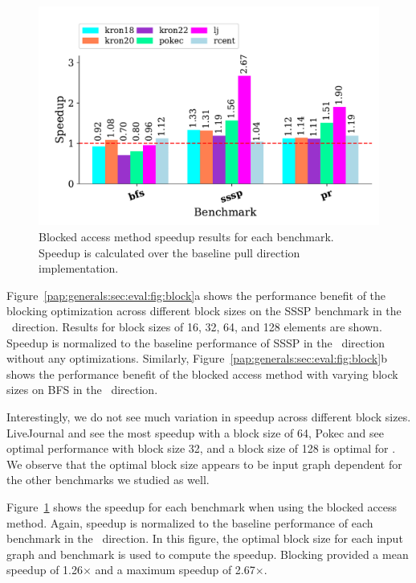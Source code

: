 \begin{figure}[h!]
    \centering
    \includegraphics[scale = 0.6]{graphit-figures/all-blocked.pdf}
    \caption{Blocked access method speedup results for each benchmark. Speedup is calculated over the baseline pull direction implementation.} %
    \label{pap:generals:sec:eval:fig:blocked}
\end{figure}
 
Figure~\ref{pap:generals:sec:eval:fig:block}a shows the performance benefit of the blocking optimization across different block sizes on the SSSP benchmark in the \pull~direction. 
Results for block sizes of 16, 32, 64, and 128 elements are shown.
Speedup is normalized to the baseline performance of SSSP in the \pull~direction without any optimizations.
Similarly, Figure~\ref{pap:generals:sec:eval:fig:block}b shows the performance benefit of the blocked access method with varying block sizes on BFS in the \pull~direction.
 
Interestingly, we do not see much variation in speedup across different block sizes. 
LiveJournal and  see the most speedup with a block size of 64, Pokec and  see optimal performance with block size 32, and a block size of 128 is optimal for . 
We observe that the optimal block size appears to be input graph dependent for the other benchmarks we studied as well. 
 
Figure~\ref{pap:generals:sec:eval:fig:blocked} shows the speedup for each benchmark when using the blocked access method. 
Again, speedup is normalized to the baseline performance of each benchmark in the \pull~direction.
In this figure, the optimal block size for each input graph and benchmark is used to compute the speedup. 
Blocking provided a mean speedup of 1.26$\times$ and a maximum speedup of 2.67$\times$.
 
